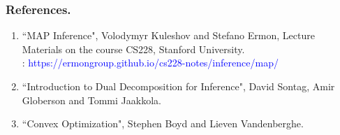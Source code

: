 \documentclass[11pt]{beamer}
\newtheorem*{pf of lemma}{\it Proof of the \normalfont \bf Lemma}
\newtheorem*{pf of claim}{\it Proof of the \normalfont \sf Claim}
\begin{document}
\begin{frame}
\frametitle{References.}

\begin{enumerate}
\item ``MAP Inference", Volodymyr Kuleshov and Stefano Ermon, Lecture Materials on the course CS228, Stanford University. \\
: \textcolor{blue}{https://ermongroup.github.io/cs228-notes/inference/map/}  \\
\item ``Introduction to Dual Decomposition for Inference", David Sontag, Amir Globerson and Tommi Jaakkola. \\
\item ``Convex Optimization", Stephen Boyd and Lieven Vandenberghe.
\end{enumerate}

\end{frame}
\end{document}

